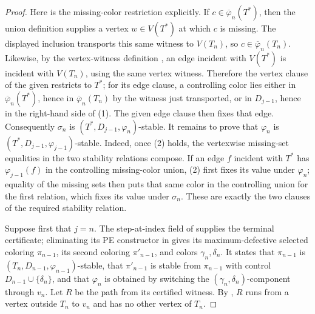 \begin{proof}
Here is the missing-color restriction explicitly.  If
\(c\in\overline\varphi_n(T^*)\), then the union definition
 supplies a vertex \(w\in V(T^*)\) at which
\(c\) is missing.  The displayed inclusion transports this same witness to
\(V(T_n)\), so \(c\in\overline\varphi_n(T_n)\).  Likewise, by the
vertex-witness definition , an edge incident with
\(V(T^*)\) is incident with \(V(T_n)\), using the same vertex witness.
Therefore the vertex clause of the given
 restricts to \(T^*\); for its edge clause, a
controlling color lies either in \(\overline\varphi_n(T^*)\), hence in
\(\overline\varphi_n(T_n)\) by the witness just transported, or in
\(D_{j-1}\), hence in the right-hand side of (1).  The given edge clause
then fixes that edge.  Consequently \(\sigma_n\) is
\((T^*,D_{j-1},\varphi_n)\)-stable.
It remains to prove that \(\varphi_n\) is
\((T^*,D_{j-1},\varphi_{j-1})\)-stable.                         
Indeed, once (2) holds, the vertexwise missing-set equalities in the two
stability relations compose.  If an edge \(f\) incident with \(T^*\) has
\(\varphi_{j-1}(f)\) in the controlling missing-color union, (2) first
fixes its value under \(\varphi_n\); equality of the missing sets then
puts that same color in the controlling union for the first relation, which
fixes its value under \(\sigma_n\).  These are exactly the two clauses of
the required stability relation.

Suppose first that \(j=n\).  The step-at-index field of
 supplies the terminal certificate; eliminating
its PE constructor in  gives its
maximum-defective selected coloring \(\pi_{n-1}\), its second coloring
\(\pi'_{n-1}\), and colors \(\gamma_n,\delta_n\).  It states that \(\pi_{n-1}\) is
\((T_n,D_{n-1},\varphi_{n-1})\)-stable, that \(\pi'_{n-1}\) is stable from
\(\pi_{n-1}\) with control \(D_{n-1}\cup\{\delta_n\}\), and that
\(\varphi_n\) is obtained by switching the
\((\gamma_n,\delta_n)\)-component through \(v_n\).  Let \(R\) be the path
from its certified  witness.  By
, \(R\) runs from a vertex outside \(T_n\) to \(v_n\)
and has no other vertex of \(T_n\).


\end{proof}
